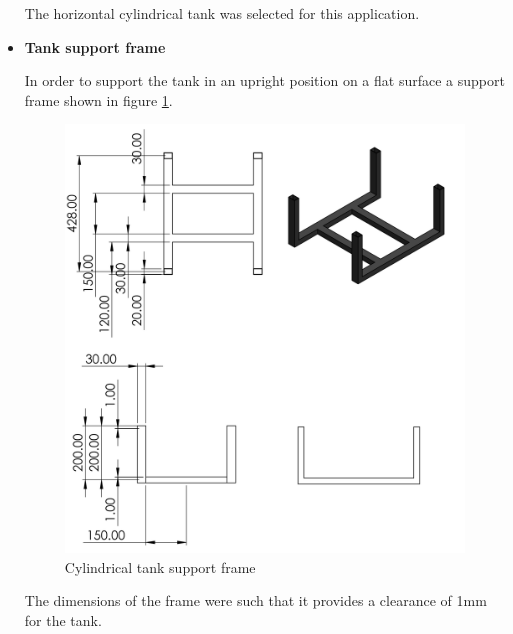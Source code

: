 \begin{itemize}
The horizontal cylindrical tank was selected for this application.
\par
\item \textbf{Tank support frame}
\par
In order to support the tank in an upright position on a flat surface a support frame shown in figure \ref{fig:cylindrical_tank_support_frame}.

\begin{figure}[H]
    \centering
    \includegraphics[height=.55\textheight]{Figures/tankHolder.PNG}
    \caption{Cylindrical tank support frame}
    \label{fig:cylindrical_tank_support_frame}
\end{figure}

The dimensions of the frame were such that it provides a clearance of 1mm for the tank.


\end{itemize}
